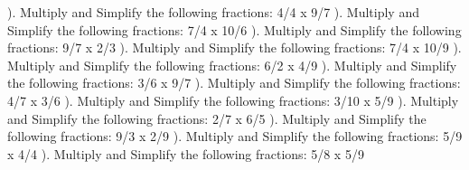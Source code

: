 \documentclass{article}%
\begin{document}
\newline%
). Multiply and Simplify the following fractions: 4/4 x 9/7%
\newline%
\newline%
). Multiply and Simplify the following fractions: 7/4 x 10/6%
\newline%
\newline%
). Multiply and Simplify the following fractions: 9/7 x 2/3%
\newline%
\newline%
). Multiply and Simplify the following fractions: 7/4 x 10/9%
\newline%
\newline%
). Multiply and Simplify the following fractions: 6/2 x 4/9%
\newline%
\newline%
). Multiply and Simplify the following fractions: 3/6 x 9/7%
\newline%
\newline%
). Multiply and Simplify the following fractions: 4/7 x 3/6%
\newline%
\newline%
). Multiply and Simplify the following fractions: 3/10 x 5/9%
\newline%
\newline%
). Multiply and Simplify the following fractions: 2/7 x 6/5%
\newline%
\newline%
). Multiply and Simplify the following fractions: 9/3 x 2/9%
\newline%
\newline%
). Multiply and Simplify the following fractions: 5/9 x 4/4%
\newline%
\newline%
). Multiply and Simplify the following fractions: 5/8 x 5/9%
\newline%
\newline%
\end{document}
